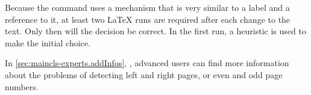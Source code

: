 Because the  command uses a mechanism that is very
similar to a label and a reference to it, at least two {\LaTeX} runs are
required after each change to the text. Only then will the decision be
correct. In the first run, a heuristic is used to make the initial choice.

In \autoref{sec:maincls-experts.addInfos},
, advanced users can find more
information about the problems of detecting left and right pages, or even and
odd page numbers.%
%
%
\EndIndexGroup
%
\EndIndexGroup

